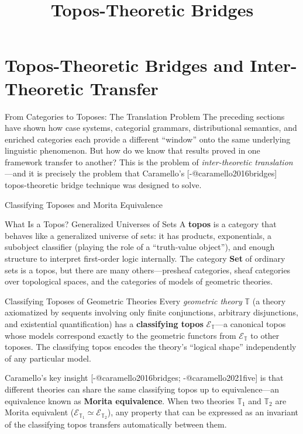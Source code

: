 \documentclass[
  ignorenonframetext,
]{beamer}
\title{\texorpdfstring{Topos-Theoretic
Bridges}{Topos-Theoretic Bridges}}
\author{\texorpdfstring{}{}}
\date{}
\begin{document}
\frame{\titlepage}

\section{Topos-Theoretic Bridges and Inter-Theoretic
Transfer}\label{sec:topos-theory}

\begin{frame}{From Categories to Toposes: The Translation Problem}
\protect{}\label{from-categories-to-toposes-the-translation-problem}
The preceding sections have shown how case systems, categorial grammars,
distributional semantics, and enriched categories each provide a
different ``window'' onto the same underlying linguistic phenomenon. But
how do we know that results proved in one framework transfer to another?
This is the problem of \emph{inter-theoretic translation}---and it is
precisely the problem that Caramello's {[}-@caramello2016bridges{]}
topos-theoretic bridge technique was designed to solve.
\end{frame}

\begin{frame}{Classifying Toposes and Morita Equivalence}
\protect{}\label{classifying-toposes-and-morita-equivalence}
\begin{block}{What Is a Topos? Generalized Universes of Sets}
\protect{}\label{what-is-a-topos-generalized-universes-of-sets}
A \textbf{topos} is a category that behaves like a generalized universe
of sets: it has products, exponentials, a subobject classifier (playing
the role of a ``truth-value object''), and enough structure to interpret
first-order logic internally. The category \textbf{Set} of ordinary sets
is a topos, but there are many others---presheaf categories, sheaf
categories over topological spaces, and the categories of models of
geometric theories.
\end{block}

\begin{block}{Classifying Toposes of Geometric Theories}
\protect{}\label{classifying-toposes-of-geometric-theories}
Every \emph{geometric theory} \(\mathbb{T}\) (a theory axiomatized by
sequents involving only finite conjunctions, arbitrary disjunctions, and
existential quantification) has a \textbf{classifying topos}
\(\mathcal{E}_\mathbb{T}\)---a canonical topos whose models correspond
exactly to the geometric functors from \(\mathcal{E}_\mathbb{T}\) to
other toposes. The classifying topos encodes the theory's ``logical
shape'' independently of any particular model.

Caramello's key insight {[}-@caramello2016bridges;
-@caramello2021five{]} is that different theories can share the same
classifying topos up to equivalence---an equivalence known as
\textbf{Morita equivalence}. When two theories \(\mathbb{T}_1\) and
\(\mathbb{T}_2\) are Morita equivalent
(\(\mathcal{E}_{\mathbb{T}_1} \simeq \mathcal{E}_{\mathbb{T}_2}\)), any
property that can be expressed as an invariant of the classifying topos
transfers automatically between them.
\end{block}
\end{frame}
\end{document}
